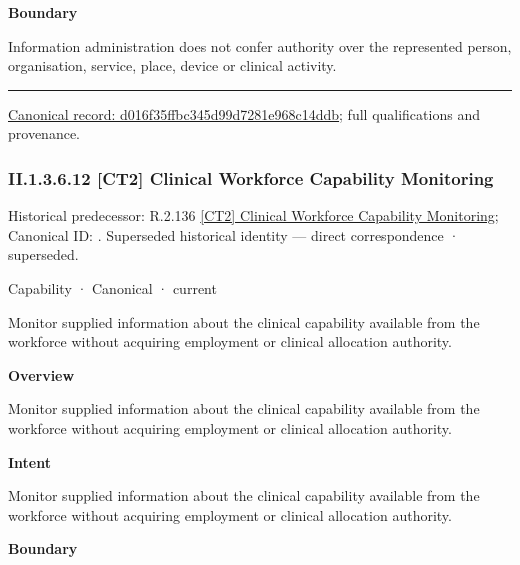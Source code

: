 \textbf{Boundary}



Information administration does not confer authority over the represented person, organisation, service, place, device or clinical activity.



\medskip\hrule\medskip

{\footnotesize \href{../../../../../../../continuum/strategy/capability/d016f35ffbc345d99d7281e968c14ddb.md}{Canonical record: d016f35ffbc345d99d7281e968c14ddb}; full qualifications and provenance.}\par
\subsubsection*{II.1.3.6.12 [CT2] Clinical Workforce Capability Monitoring}
\label{navigation:II.1.3.6.12}

{\small Historical predecessor: R.2.136 \hyperref[element:24c015676c254e2e82e8e4287c295179]{[CT2] Clinical Workforce Capability Monitoring}; Canonical ID: \texttt{}. Superseded historical identity — direct correspondence · superseded.}\par
\label{element:367b3e5643f44fa785f093db8bb9a6e8}
{\small Capability · Canonical · current}\par

Monitor supplied information about the clinical capability available from the workforce without acquiring employment or clinical allocation authority.



\textbf{Overview}



Monitor supplied information about the clinical capability available from the workforce without acquiring employment or clinical allocation authority.



\textbf{Intent}



Monitor supplied information about the clinical capability available from the workforce without acquiring employment or clinical allocation authority.



\textbf{Boundary}



